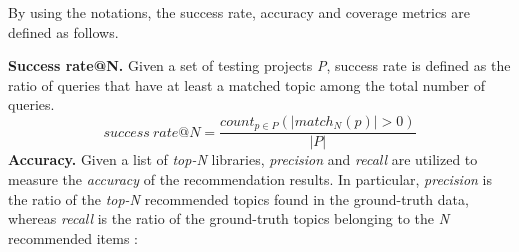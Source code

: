 \noindent By using the notations, the success rate, accuracy and coverage metrics are defined as follows.  


\vspace{.1cm}
\noindent\textbf{Success rate@N.} Given a set of testing projects \emph{P}, success rate is defined as the ratio of queries that have at least a matched topic among the total number of queries.%
\vspace{-.1cm}
\begin{equation} \label{eqn:RecallRate}
success\ rate@N=\frac{ count_{p \in P}( \left | match_{N}(p) \right | > 0 ) }{\left | P \right |} %
\end{equation}
\vspace{.1cm}
%
%
\noindent \textbf{Accuracy.} Given a list of \emph{top-N} libraries, \emph{precision} and \emph{recall} are utilized to measure the \emph{accuracy} of the recommendation results. In particular,  \emph{precision} is the ratio of the \emph{top-N} recommended topics found in the ground-truth data, whereas \emph{recall} is the ratio of the ground-truth topics belonging to the \emph{N} recommended items \cite{Davis:2006:RPR:1143844.1143874,Nguyen:2019:FRS:3339505.3339636}:

